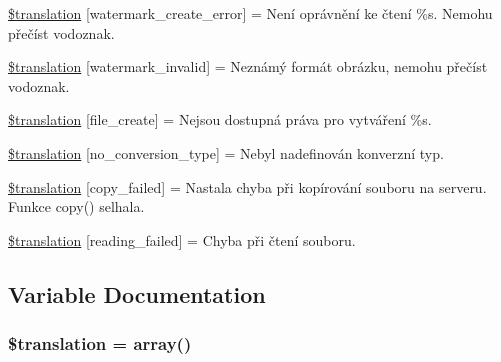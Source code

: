 \begin{DoxyCompactItemize}
\item 
\hyperlink{class_8upload_8cs___c_s_8php_aabca0b65dadbc6184415c16375f284ca}{\$translation} \mbox{[}\textquotesingle{}watermark\+\_\+create\+\_\+error\textquotesingle{}\mbox{]} = \textquotesingle{}Není oprávnění ke čtení \%s. Nemohu přečíst vodoznak.\textquotesingle{}
\item 
\hyperlink{class_8upload_8cs___c_s_8php_ac336e7a5701e47ba4a05e9e498a3cc44}{\$translation} \mbox{[}\textquotesingle{}watermark\+\_\+invalid\textquotesingle{}\mbox{]} = \textquotesingle{}Neznámý formát obrázku, nemohu přečíst vodoznak.\textquotesingle{}
\item 
\hyperlink{class_8upload_8cs___c_s_8php_a1ecb4673e4fb69e06b3f20b65cecf30a}{\$translation} \mbox{[}\textquotesingle{}file\+\_\+create\textquotesingle{}\mbox{]} = \textquotesingle{}Nejsou dostupná práva pro vytváření \%s.\textquotesingle{}
\item 
\hyperlink{class_8upload_8cs___c_s_8php_a4712d7ec28e9a7f17eb3338af2358363}{\$translation} \mbox{[}\textquotesingle{}no\+\_\+conversion\+\_\+type\textquotesingle{}\mbox{]} = \textquotesingle{}Nebyl nadefinován konverzní typ.\textquotesingle{}
\item 
\hyperlink{class_8upload_8cs___c_s_8php_a783c9358bcf54a054545b50098bc679b}{\$translation} \mbox{[}\textquotesingle{}copy\+\_\+failed\textquotesingle{}\mbox{]} = \textquotesingle{}Nastala chyba při kopírování souboru na serveru. Funkce copy() selhala.\textquotesingle{}
\item 
\hyperlink{class_8upload_8cs___c_s_8php_a01bea14c9fd5f353f62db44beabfcd42}{\$translation} \mbox{[}\textquotesingle{}reading\+\_\+failed\textquotesingle{}\mbox{]} = \textquotesingle{}Chyba při čtení souboru.\textquotesingle{}
\end{DoxyCompactItemize}


\subsection{Variable Documentation}
\hypertarget{class_8upload_8cs___c_s_8php_a1f198d410fecc3871ebdd468d343a5e3}{}
\subsubsection[{\$translation}]{\setlength{\rightskip}{0pt plus 5cm}\$translation = array()}\label{class_8upload_8cs___c_s_8php_a1f198d410fecc3871ebdd468d343a5e3}
\hypertarget{class_8upload_8cs___c_s_8php_ac7498e49b9771b04698029aa61c70821}{}
